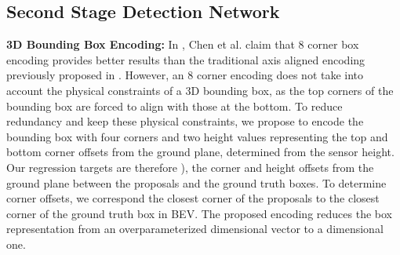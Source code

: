 \documentclass[letterpaper, 10 pt, conference]{ieeeconf}
\begin{document}
\subsection{Second Stage Detection Network}
\label{seco}
\noindent \textbf{3D Bounding Box Encoding:} In \cite{cvpr17chen}, Chen et al. claim that 8 corner box encoding  provides better results than the traditional axis aligned encoding previously proposed in \cite{song2016deep}. However, an 8 corner encoding does not take into account the physical constraints of a 3D bounding box, as the top corners of the bounding box are forced to align with those at the bottom. To reduce redundancy and keep these physical constraints, we propose to encode the bounding box with four corners and two height values representing the top and bottom corner offsets from the ground plane, determined from the sensor height. Our regression targets are therefore ), the corner and height offsets from the ground plane between the proposals and the ground truth boxes. To determine corner offsets, we correspond the closest corner of the proposals to the closest corner of the ground truth box in BEV. The proposed encoding reduces the box representation from an overparameterized  dimensional vector to a  dimensional one. \\
\end{document}
